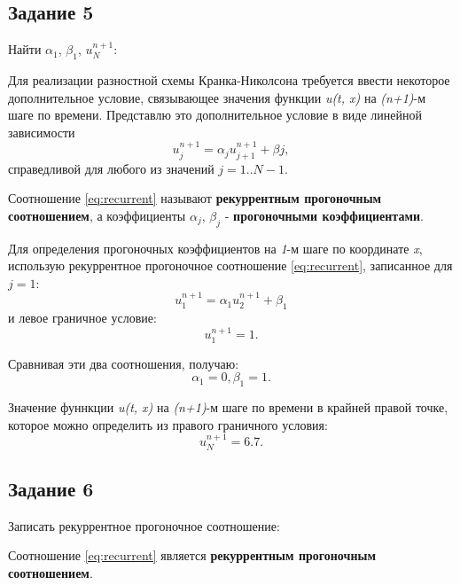 \documentclass[12pt, a4paper]{report}
\begin{document}
	\subsection*{Задание 5}
	\large
	Найти $\alpha_1$, $\beta_1$, $u_{N}^{n+1}$: \par
	Для реализации разностной схемы Кранка-Николсона требуется ввести некоторое дополнительное условие, связывающее значения функции \textit{u(t, x)} на \textit{(n+1)}-м шаге по времени. Представлю это дополнительное условие в виде линейной зависимости
	\begin{equation}\label{eq:recurrent}
		u_{j}^{n+1} = \alpha_{j} u_{j+1}^{n+1} + \beta{j},
	\end{equation}
	справедливой для любого из значений $j=1..N-1$. \par
	Соотношение \eqref{eq:recurrent} называют \textbf{рекуррентным прогоночным соотношением}, а коэффициенты $\alpha_{j}$, $\beta_{j}$ - \textbf{прогоночными коэффициентами}. \\
	\par
	Для определения прогоночных коэффициентов на \textit{1}-м шаге по координате \textit{x}, использую рекуррентное прогоночное соотношение \eqref{eq:recurrent}, записанное для $j=1$:
	\begin{equation*}
		u_{1}^{n+1} = \alpha_{1} u_{2}^{n+1} + \beta_{1}
	\end{equation*}
	и левое граничное условие:
	\begin{equation*}
		u_{1}^{n+1} = 1.
	\end{equation*}
	\par
	Сравнивая эти два соотношения, получаю:
	\begin{equation*}
		\alpha_{1} = 0, \beta_{1} = 1.
	\end{equation*}
	\par
	Значение фуннкции \textit{u(t, x)} на \textit{(n+1)}-м шаге по времени в крайней правой точке, которое можно определить из правого граничного условия:
	\begin{equation*}
		u_{N}^{n+1} = 6.7.
	\end{equation*}
	
	\subsection*{Задание 6}
	\large
	Записать рекуррентное прогоночное соотношение: \par
	Соотношение \eqref{eq:recurrent} является \textbf{рекуррентным прогоночным соотношением}.
	
\end{document}
